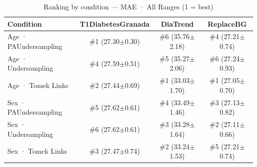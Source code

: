 \begin{table}[htbp]
\centering
\small
\caption{Ranking by condition — MAE · All Ranges  (1 = best)}
\label{tab:ranking_mae_entire_family_size_undersampling}
\begin{tabular}{lccc}
\toprule
\textbf{Condition} & \textbf{T1DiabetesGranada} & \textbf{DiaTrend} & \textbf{ReplaceBG} \\
\midrule
Age · PAUndersampling & \#1 (27.30$\pm$0.30) & \#6 (35.76$\pm$2.18) & \#4 (27.21$\pm$0.74) \\
Age · Undersampling & \#4 (27.59$\pm$0.51) & \#5 (35.27$\pm$2.06) & \#6 (27.24$\pm$0.93) \\
Age · Tomek Links & \#2 (27.44$\pm$0.69) & \#1 (33.03$\pm$1.70) & \#1 (27.05$\pm$0.70) \\
\midrule
Sex · PAUndersampling & \#5 (27.62$\pm$0.61) & \#4 (33.49$\pm$1.46) & \#3 (27.13$\pm$0.82) \\
Sex · Undersampling & \#6 (27.62$\pm$0.61) & \#3 (33.28$\pm$1.64) & \#2 (27.11$\pm$0.66) \\
Sex · Tomek Links & \#3 (27.47$\pm$0.74) & \#2 (33.24$\pm$1.53) & \#5 (27.21$\pm$0.74) \\
\bottomrule
\end{tabular}
\end{table}